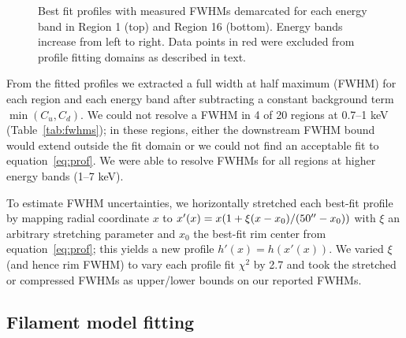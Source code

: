 \documentclass[iop, apj, numberedappendix]{emulateapj}
\begin{document}
\begin{figure*}%
    \iftoggle{manuscript}{
        \epsscale{1}
    }{}
    \caption{Best fit profiles with measured FWHMs demarcated for each energy
        band in Region 1 (top) and Region 16 (bottom).  Energy bands increase
        from left to right.  Data points in red were excluded from profile
        fitting domains as described in text.}
    \label{fig:profiles}
\end{figure*}

From the fitted profiles we extracted a full width at half maximum (FWHM) for
each region and each energy band after subtracting a constant background term
$\min(C_u, C_d)$.  We could not resolve a FWHM in 4 of 20 regions at 0.7--1 keV
(Table~\ref{tab:fwhms}); in these regions, either the downstream FWHM bound
would extend outside the fit domain or we could not find an acceptable fit to
equation~\eqref{eq:prof}.  We were able to resolve FWHMs for all regions at
higher energy bands (1--7 keV).

To estimate FWHM uncertainties, we horizontally stretched each best-fit
profile by mapping radial coordinate $x$ to
$x'(x) = x (1 + \xi (x-x_0)/(50\mbox{$^{\prime\prime}$}-x_0))$ with $\xi$ an arbitrary stretching
parameter and $x_0$ the best-fit rim center from equation~\eqref{eq:prof};
this yields a new profile $h'(x) = h(x'(x))$.
We varied $\xi$ (and hence rim FWHM) to vary each profile fit $\chi^2$ by 2.7
and took the stretched or compressed FWHMs as upper/lower bounds on our
reported FWHMs.

\subsection{Filament model fitting}
\label{sec:fits}
\end{document}
